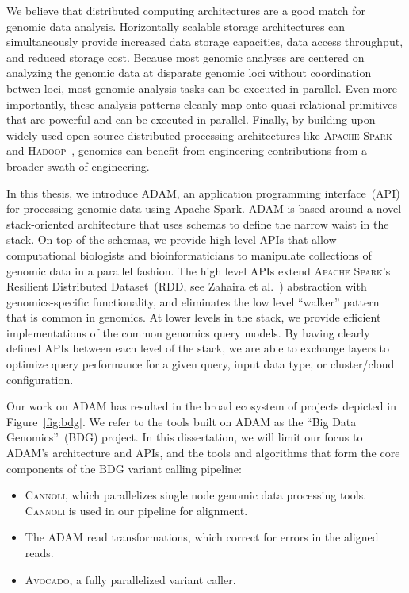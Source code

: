 \documentclass[phd]{ucbthesis}
\begin{document}
We believe that distributed computing architectures are a good match for
genomic data analysis. Horizontally scalable storage architectures can
simultaneously provide increased data storage capacities, data access
throughput, and reduced storage cost. Because most genomic analyses are centered
on analyzing the genomic data at disparate genomic loci without coordination
betwen loci, most genomic analysis tasks can be executed in parallel. Even more
importantly, these analysis patterns cleanly map onto quasi-relational primitives
that are powerful and can be executed in parallel. Finally, by building upon
widely used open-source distributed processing architectures like \textsc{Apache
Spark}~\cite{zaharia12} and \textsc{Hadoop}~\cite{hadoop}, genomics can benefit
from engineering contributions from a broader swath of engineering.

In this thesis, we introduce \textsc{ADAM}, an application programming
interface~(API) for processing genomic data using Apache Spark. \textsc{ADAM}
is based around a novel stack-oriented architecture that uses schemas to define
the narrow waist in the stack. On top of the schemas, we provide high-level
APIs that allow computational biologists and bioinformaticians to manipulate
collections of genomic data in a parallel fashion. The high level APIs extend
\textsc{Apache Spark}'s Resilient Distributed Dataset~(RDD, see Zahaira et
al.~\cite{zaharia12}) abstraction with genomics-specific functionality, and
eliminates the low level ``walker'' pattern~\cite{mckenna10} that is common in
genomics. At lower levels in the stack, we provide efficient implementations
of the common genomics query models. By having clearly defined APIs between
each level of the stack, we are able to exchange layers to optimize query
performance for a given query, input data type, or cluster/cloud configuration.

Our work on \textsc{ADAM} has resulted in the broad ecosystem of projects
depicted in Figure~\ref{fig:bdg}. We refer to the tools built on \textsc{ADAM}
as the ``Big Data Genomics''~(BDG) project. In this dissertation, we will limit
our focus to \textsc{ADAM}'s architecture and APIs, and the tools and algorithms
that form the core components of the BDG variant calling pipeline:

\begin{itemize}
\item \textsc{Cannoli}, which parallelizes single node genomic data processing
  tools. \textsc{Cannoli} is used in our pipeline for alignment.
\item The \textsc{ADAM} read transformations, which correct for errors in the
  aligned reads.
\item \textsc{Avocado}, a fully parallelized variant caller.
\end{itemize}
\end{document}
